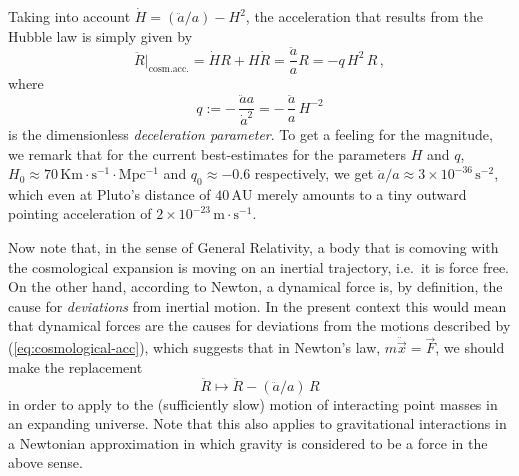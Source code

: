 \documentclass
[rmp,aps,twocolumn,showpacs,preprintnumbers,amsmath,amssymb]{revtex4}
\theoremstyle{plain}
\theoremstyle{definition}
\theoremstyle{remark}
\begin{document}
Taking into account $\dot H=(\ddot a/a)-H^2$, the 
acceleration that results from the Hubble law is simply given by 
%
\begin{equation}\label{eq:cosmological-acc}
  \ddot{R}|_{\mathrm{cosm. acc.}} 
  = \dot HR + H\dot R
  = \frac{\ddot{a}}{a}R
  = -q\,H^2\,R \,,
\end{equation}
%
where 
%
\begin{equation}\label{eq:def:DecelerationParameter}
  q:=-\,\frac{\ddot aa}{{\dot a}^2}
    =-\,\frac{\ddot a}{a}\,H^{-2}
\end{equation}
%
is the dimensionless \emph{deceleration parameter}. To get a feeling 
for the magnitude, we remark that for the current best-estimates 
for the parameters $H$ and $q$, 
$H_0\approx 70\,\mathrm{Km\cdot s^{-1}\cdot Mpc^{-1}}$ and 
$q_0\approx -0.6$ respectively, we get 
$\ddot a/a\approx 3\times 10^{-36}\,\mathrm{s}^{-2}$, which even 
at Pluto's distance of $40\,\mathrm{AU}$ merely amounts to a 
tiny outward pointing acceleration of 
$2\times 10^{-23}\,\mathrm{m\cdot s^{-1}}$. 

Now note that, in the sense of General Relativity, a body that is 
comoving with the cosmological expansion is moving on an inertial 
trajectory, i.e.~it is force free. On the other hand, according 
to Newton, a dynamical force is, by definition, the cause for 
\emph{deviations} from  inertial motion. In the 
present context this would mean that dynamical forces are the 
causes for deviations from the motions described by 
(\ref{eq:cosmological-acc}), which suggests that in Newton's 
law, $m\ddot{\vec x}=\vec F$, we should make the replacement 
%
\begin{equation}\label{eq:ReplaceAcceleration}
  \ddot R \mapsto \ddot R-(\ddot a/a)\,R
\end{equation}
%
in order to apply to the (sufficiently slow) motion of interacting 
point masses in an expanding universe. Note that this also applies 
to gravitational interactions in a Newtonian approximation in which 
gravity is considered to be a force in the above sense. 
\end{document}
